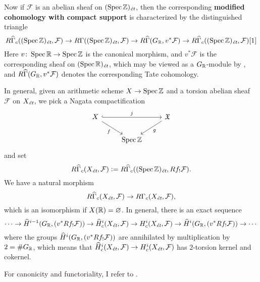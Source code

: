 \documentclass{article}
\numberwithin{equation}{section}
\begin{document}
\begin{appendices}
Now if $\mathcal{F}$ is an abelian sheaf on $(\Spec \ZZ)_\et$, then the
corresponding \textbf{modified cohomology with compact support} is characterized
by the distinguished triangle
\[ R\widehat{\Gamma}_c ((\Spec \ZZ)_\et, \mathcal{F}) \to
R\Gamma ((\Spec \ZZ)_\et, \mathcal{F}) \to
R\widehat{\Gamma} (G_\RR, v^* \mathcal{F}) \to
R\widehat{\Gamma}_c ((\Spec \ZZ)_\et, \mathcal{F}) [1] \]
Here $v\colon \Spec \RR \to \Spec \ZZ$ is the canonical morphism, and
$v^* \mathcal{F}$ is the corresponding sheaf on $(\Spec \RR)_\et$, which may be
viewed as a $G_\RR$-module by \cite[Exposé~VII, 2.3]{SGA4}, and
$R\widehat{\Gamma} (G_\RR, v^* \mathcal{F})$ denotes the corresponding Tate
cohomology.

In general, given an arithmetic scheme $X \to \Spec \ZZ$ and a torsion abelian
sheaf $\mathcal{F}$ on $X_\et$, we pick a Nagata compactification
\[ \begin{tikzcd}
  X \ar[hookrightarrow]{rr}{j}\ar{dr}[swap]{f} & & \mathfrak{X} \ar{dl}{g} \\
  & \Spec \ZZ
\end{tikzcd} \]
and set
\[ R\widehat{\Gamma}_c (X_\et, \mathcal{F}) \dfn
R\widehat{\Gamma}_c ((\Spec \ZZ)_\et, R f_! \mathcal{F}). \]
We have a natural morphism
$$R\widehat{\Gamma}_c (X_\et, \mathcal{F}) \to R\Gamma_c (X_\et, \mathcal{F}),$$
which is an isomorphism if $X (\RR) = \emptyset$. In general, there is an
exact sequence
\[ \cdots \to \widehat{H}^{i-1} (G_\RR, (v^* Rf_! \mathcal{F})) \to
\widehat{H}^i_c (X_\et, \mathcal{F}) \to
H^i_c (X_\et, \mathcal{F}) \to
\widehat{H}^i (G_\RR, (v^* Rf_! \mathcal{F})) \to \cdots \]
where the groups $\widehat{H}^i (G_\RR, (v^* Rf_! \mathcal{F}))$ are annihilated
by multiplication by $2 = \# G_\RR$, which means that
$\widehat{H}^i_c (X_\et,\mathcal{F}) \to H^i_c (X_\et,\mathcal{F})$
has $2$-torsion kernel and cokernel.

For canonicity and functoriality, I refer to \cite[\S 2]{Geisser-Schmidt-2018}.
\end{appendices}


\pagebreak


\end{document}
